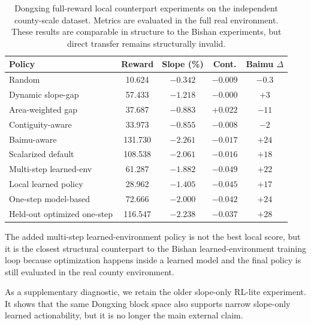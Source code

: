 \documentclass[11pt]{article}
\begin{document}
\begin{table}[htbp]
\centering
\scriptsize
\setlength{\tabcolsep}{3pt}
\caption{Dongxing full-reward local counterpart experiments on the independent county-scale dataset. Metrics are evaluated in the full real environment. These results are comparable in structure to the Bishan experiments, but direct transfer remains structurally invalid.}
\label{tab:dongxing_full_counterpart}
\begin{tabular}{lcccc}
\toprule
Policy & Reward & Slope (\%) & Cont. & Baimu $\Delta$ \\
\midrule
Random & 10.624 & $-0.342$ & $-0.009$ & $-0.3$ \\
Dynamic slope-gap & 57.433 & $-1.218$ & $-0.000$ & $+3$ \\
Area-weighted gap & 37.687 & $-0.883$ & $+0.022$ & $-11$ \\
Contiguity-aware & 33.973 & $-0.855$ & $-0.008$ & $-2$ \\
Baimu-aware & 131.730 & $-2.261$ & $-0.017$ & $+24$ \\
Scalarized default & 108.538 & $-2.061$ & $-0.016$ & $+18$ \\
Multi-step learned-env & 61.287 & $-1.882$ & $-0.049$ & $+22$ \\
Local learned policy & 28.962 & $-1.405$ & $-0.045$ & $+17$ \\
One-step model-based & 72.666 & $-2.000$ & $-0.042$ & $+24$ \\
Held-out optimized one-step & 116.547 & $-2.238$ & $-0.037$ & $+28$ \\
\bottomrule
\end{tabular}
\end{table}

The added multi-step learned-environment policy is not the best local score, but it is the closest structural counterpart to the Bishan learned-environment training loop because optimization happens inside a learned model and the final policy is still evaluated in the real county environment.

As a supplementary diagnostic, we retain the older slope-only RL-lite experiment. It shows that the same Dongxing block space also supports narrow slope-only learned actionability, but it is no longer the main external claim.
\end{document}

